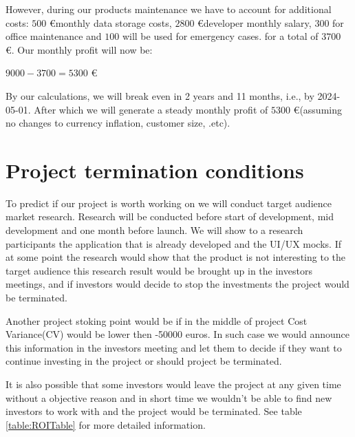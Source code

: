 \documentclass{VUMIFPSkursinis}
\begin{document}
However, during our products maintenance we have to account for additional costs: $500$ \euro monthly data storage costs, $2800$ \euro developer monthly salary, $300$ for office maintenance and $100$ will be used for emergency cases. for a total of $3700$ \euro. Our monthly profit will now be:
\begin{center}
	$9000 - 3700 = 5300$ \euro
\end{center}
  By our calculations, we will break even in 2 years and 11 months, i.e., by 2024-05-01. After which we will generate a steady monthly profit of $5300$ \euro (assuming no changes to currency inflation, customer size, .etc).

\section{Project termination conditions}
	To predict if our project is worth working on we will conduct target audience market research.
	Research will be conducted before start of development, mid development and one month before launch.
	We will show to a research participants the application that is already developed and the UI/UX mocks.
	If at some point the research would show that the product is not interesting to the target audience this research result would be brought up in the investors meetings, and if investors would decide to stop the investments the project would be terminated.
	

	Another project stoking point would be if in the middle of project Cost Variance(CV) would be lower then -50000 euros.
	In such case we would announce this information in the investors meeting and let them to decide if they want to continue investing in the project or should project be terminated.


	It is also possible that some investors would leave the project at any given time without a objective reason and in short time we wouldn't be able to find new investors to work with and the project would be terminated. See table \ref{table:ROITable} for more detailed information.
\end{document}
